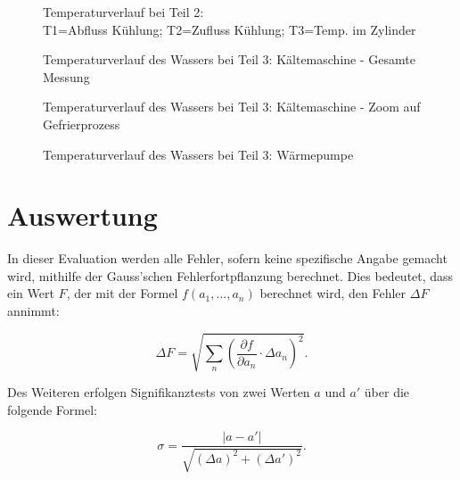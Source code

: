 \documentclass{article}
\begin{document}
\addtocounter{table}{5}

\begin{figure}[!p]
    \centering
    \caption{Temperaturverlauf bei Teil 2: \\ T1=Abfluss Kühlung; T2=Zufluss Kühlung; T3=Temp. im Zylinder}
    \label{fig:temp2}
\end{figure}

\begin{figure}[!p]
    \centering
    \caption{Temperaturverlauf des Wassers bei Teil 3: Kältemaschine - Gesamte Messung}
    \label{fig:temp31-ges}
\end{figure}

\begin{figure}[!p]
    \centering
    \caption{Temperaturverlauf des Wassers bei Teil 3: Kältemaschine - Zoom auf Gefrierprozess}
    \label{fig:temp31-zoom}
\end{figure}

\begin{figure}[!p]
    \centering
    \caption{Temperaturverlauf des Wassers bei Teil 3: Wärmepumpe}
    \label{fig:temp3.2-wärmepumpe}
\end{figure}


\clearpage
\newpage
\section{Auswertung}

In dieser Evaluation werden alle Fehler, sofern keine spezifische Angabe gemacht wird, mithilfe der Gauss'schen Fehlerfortpflanzung berechnet. Dies bedeutet, dass ein Wert $F$, der mit der Formel $f(a_1, ..., a_n)$ berechnet wird, den Fehler $\Delta F$ annimmt:

\begin{equation}
    \Delta F = \sqrt{\sum_n \left( \frac{\partial f}{\partial a_n} \cdot \Delta a_n \right)^2}.
\end{equation}

Des Weiteren erfolgen Signifikanztests von zwei Werten $a$ und $a'$ über die folgende Formel:

\begin{equation}
    \sigma = \frac{|a-a'|}{\sqrt{(\Delta a)^2 + (\Delta a')^2}}.
\end{equation}
\end{document}
